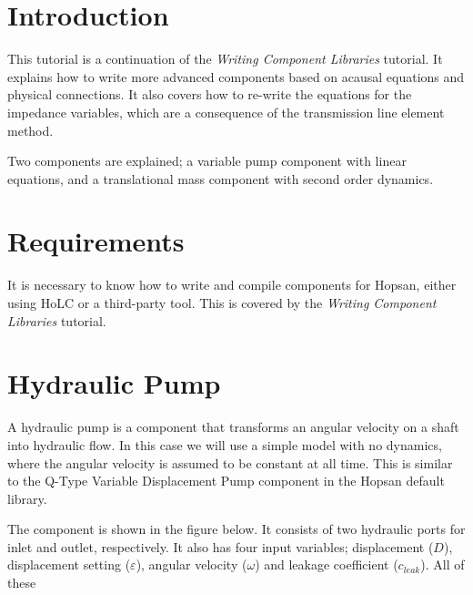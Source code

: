 \documentclass[a4paper,pdftex]{article}
\begin{document}

\section*{Introduction}
This tutorial is a continuation of the \textit{Writing Component Libraries} tutorial. It explains how to write more advanced components based on acausal equations and physical connections. It also covers how to re-write the equations for the impedance variables, which are a consequence of the transmission line element method.

Two components are explained; a variable pump component with linear equations, and a translational mass component with second order dynamics.

\section*{Requirements}
It is necessary to know how to write and compile components for Hopsan, either using HoLC or a third-party tool. This is covered by the \textit{Writing Component Libraries} tutorial.

\section*{Hydraulic Pump}
A hydraulic pump is a component that transforms an angular velocity on a shaft into hydraulic flow. In this case we will use a simple model with no dynamics, where the angular velocity is assumed to be constant at all time. This is similar to the Q-Type Variable Displacement Pump component in the Hopsan default library.

The component is shown in the figure below. It consists of two hydraulic ports for inlet and outlet, respectively. It also has four input variables; displacement ($D$), displacement setting ($\varepsilon$), angular velocity ($\omega$) and leakage coefficient ($c_{leak}$). All of these 

\end{document}
